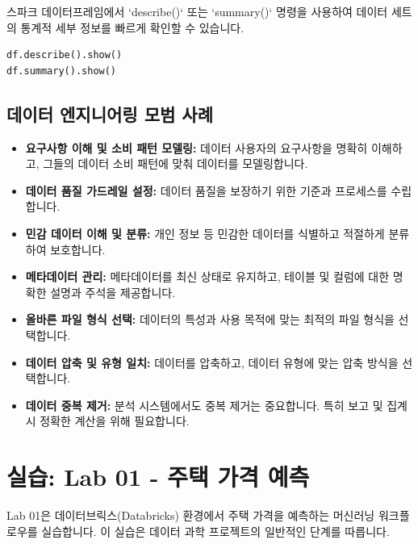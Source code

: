\documentclass[11pt,a4paper]{article}
\begin{document}
\begin{examplebox}[examplebox, title=스파크 데이터 프로파일링 예시]
스파크 데이터프레임에서 `describe()` 또는 `summary()` 명령을 사용하여 데이터 세트의 통계적 세부 정보를 빠르게 확인할 수 있습니다.
\begin{lstlisting}[language=Python, caption=Spark DataFrame 요약 통계]
df.describe().show()
df.summary().show()
\end{lstlisting}
\end{examplebox}

\subsection{데이터 엔지니어링 모범 사례}
\begin{itemize}
    \item \textbf{요구사항 이해 및 소비 패턴 모델링:} 데이터 사용자의 요구사항을 명확히 이해하고, 그들의 데이터 소비 패턴에 맞춰 데이터를 모델링합니다.
    \item \textbf{데이터 품질 가드레일 설정:} 데이터 품질을 보장하기 위한 기준과 프로세스를 수립합니다.
    \item \textbf{민감 데이터 이해 및 분류:} 개인 정보 등 민감한 데이터를 식별하고 적절하게 분류하여 보호합니다.
    \item \textbf{메타데이터 관리:} 메타데이터를 최신 상태로 유지하고, 테이블 및 컬럼에 대한 명확한 설명과 주석을 제공합니다.
    \item \textbf{올바른 파일 형식 선택:} 데이터의 특성과 사용 목적에 맞는 최적의 파일 형식을 선택합니다.
    \item \textbf{데이터 압축 및 유형 일치:} 데이터를 압축하고, 데이터 유형에 맞는 압축 방식을 선택합니다.
    \item \textbf{데이터 중복 제거:} 분석 시스템에서도 중복 제거는 중요합니다. 특히 보고 및 집계 시 정확한 계산을 위해 필요합니다.
\end{itemize}

\newpage
\section{실습: Lab 01 - 주택 가격 예측}

Lab 01은 데이터브릭스(Databricks) 환경에서 주택 가격을 예측하는 머신러닝 워크플로우를 실습합니다. 이 실습은 데이터 과학 프로젝트의 일반적인 단계를 따릅니다.
\end{document}
